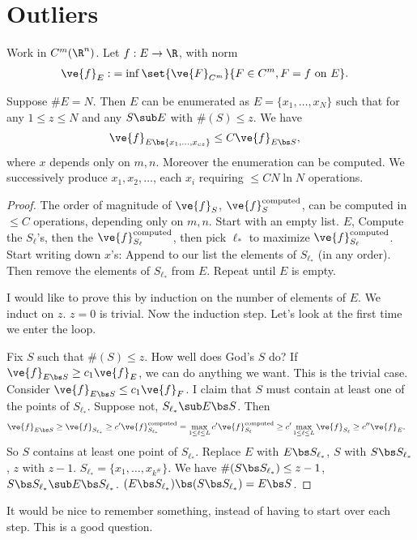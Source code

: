 \section{Outliers}

Work in $C^m(\R^n)$. 
Let $f:E\to \R$, with norm
\begin{align}
\ve{f}_E:&= \inf\set{\ve{F}_{C^m}}{F\in C^m,F=f\text{ on }E}.
\end{align}
\begin{thm}
Suppose $\#E=N$. Then $E$ can be enumerated as $E=\{x_1,\ldots, x_N\}$ such that for any $1\le z\le N$ and any $S\sub E$ with $\#(S)\le z$. 
We have
\begin{align}
\ve{f}_{E\bs \{x_1,\ldots, x_{cz}\}} &\le C\ve{f}_{E\bs S},
\end{align}
where $x$ depends only on $m,n$.  Moreover the enumeration can be computed. We successively produce $x_1,x_2,\ldots$, each $x_i$ requiring $\le CN\ln N$ operations.
\end{thm}


\begin{proof}
The order of magnitude of $\ve{f}_{S}$, $\ve{f}_S^{\text{computed}}$, can be computed in $\le C$ operations, depending only on $m,n$. %
Start with an empty list. $E$, %
Compute the $S_\ell$'s, then the $\ve{f}_{S_{\ell}}^{\text{computed}}$, then pick $\ell_*$ to maximize $\ve{f}_{S_{\ell}}^{\text{computed}}$.  %
Start writing down $x$'s:
Append to our list the elements of $S_{\ell_*}$ (in any order). Then remove the elements of $S_{\ell_*}$ from $E$.
Repeat until $E$ is empty.

I would like to prove this by induction on the number of elements of $E$.
We induct on $z$. $z=0$ is trivial. Now the induction step. Let's look at the first time we enter the loop. 

Fix $S$ such that $\#(S)\le z$. How well does God's $S$ do? If $\ve{f}_{E\bs S}\ge c_1\ve{f}_E$, we can do anything we want. %
This is the trivial case. 
Consider $\ve{f}_{E\bs S}\le c_1\ve{f}_F$. I claim that $S$ must contain at least one of the points of $S_{\ell_*}$. Suppose not, $S_{\ell_*}\sub E\bs S$. Then
\begin{align}
\ve{f}_{E\bs S} &\ge \ve{f}_{S_{\ell_*}} 
\ge c'\ve{f}_{S_{\ell_*}}^{\text{computed}}
= \max_{1\le \ell \le L}c' \ve{f}_{S_\ell}^{\text{computed}} \ge c'\max_{1\le \ell\le L} \ve{f}_{S_\ell}
\ge c'' \ve{f}_E.
\end{align}
So $S$ contains at least one point of $S_{\ell_*}$. Replace $E$ with $E\bs S_{\ell_*}$, $S$ with $S\bs S_{\ell_*}$, $z$ with $z-1$. 
$S_{\ell_*} = \{x_1,\ldots, x_{k^\#}\}$. %
We have $\#(S\bs S_{\ell_*})\le z-1$, $S\bs S_{\ell_*}\sub E\bs S_{\ell_*}$. 
$(E\bs S_{\ell_*})\bs (S\bs S_{\ell_*}) = E\bs S$. 
\end{proof}
It would be nice to remember something, instead of having to start over each step. This is a good question.
